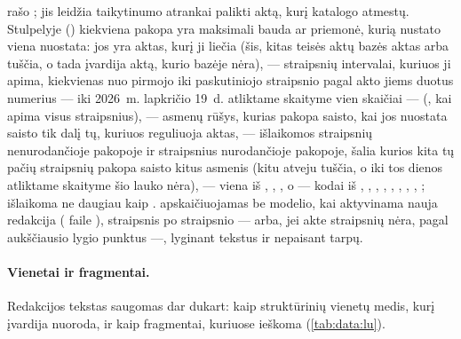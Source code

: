  rašo ; jis leidžia taikytinumo atrankai palikti aktą,
kurį katalogo  atmestų. Stulpelyje  ()
kiekviena pakopa yra maksimali bauda ar priemonė, kurią nustato viena nuostata: jos
 yra aktas, kurį ji liečia (šis, kitas teisės aktų bazės aktas arba tuščia,
o  tada įvardija aktą, kurio bazėje nėra),  --- straipsnių
intervalai, kuriuos ji apima, kiekvienas nuo pirmojo iki paskutiniojo straipsnio pagal akto
jiems duotus numerius --- iki 2026~m. lapkričio 19~d. atliktame skaityme vien skaičiai ---
(, kai apima visus straipsnius),  --- asmenų rūšys, kurias pakopa
saisto, kai jos nuostata saisto tik dalį tų, kuriuos reguliuoja aktas, --- išlaikomos
straipsnių nenurodančioje pakopoje ir straipsnius nurodančioje pakopoje, šalia kurios kita
tų pačių straipsnių pakopa saisto kitus asmenis (kitu atveju tuščia, o iki tos dienos
atliktame skaityme šio lauko nėra),  ---
viena iš , , , o  --- kodai iš
, , , ,
, , , ,
; išlaikoma ne daugiau kaip .  apskaičiuojamas be
modelio, kai aktyvinama nauja redakcija ( faile ),
straipsnis po straipsnio --- arba, jei akte straipsnių nėra, pagal aukščiausio lygio punktus
---, lyginant tekstus ir nepaisant tarpų.

\paragraph{Vienetai ir fragmentai.} Redakcijos tekstas saugomas dar dukart: kaip struktūrinių
vienetų medis, kurį įvardija nuoroda, ir kaip fragmentai, kuriuose ieškoma
(\cref{tab:data:lu}).

